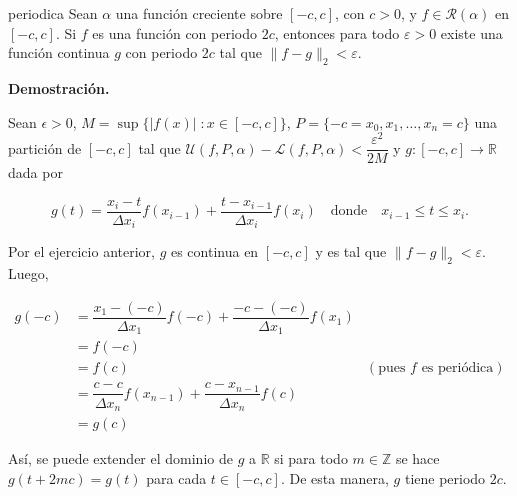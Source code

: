 \documentclass[fleqn]{article}
\newenvironment{corolario}[2]{\begin{cor}[breakable, pad at break = 5mm, leftrule = 0.7mm, rightrule = 0.7mm, right = 2mm, left = 2mm, enlarge bottom finally by = 3mm, fontupper = \setlength{\parskip}{2mm}, fontlower = \setlength{\parskip}{2mm}]{#1}{#2}}{\end{cor}}
\newcommand{\talque}{\; \mathbf{\colon}}
\newcommand{\rsi}[1]{\mathcal{R}(#1)}
\newcommand{\ent}{\mathbb{Z}}
\newcommand{\real}{\mathbb{R}}
\begin{document}
	\begin{corolario}{}{periodica}
		Sean $ \alpha $ una función creciente sobre $ [-c,c] $, con $ c > 0 $, y $ f \in \rsi{\alpha} $ en $ [-c,c] $.
		Si $f$ es una función con periodo $ 2c $, entonces para todo $ \varepsilon > 0 $ existe una función continua $ g $ con periodo $ 2c $ tal que $ \lVert f - g \rVert_2 < \varepsilon $.

		\tcblower

		\textbf{Demostración.}

		Sean $ \epsilon > 0 $, $ M = \sup \bigl\lbrace \lvert f(x) \rvert \talque x \in [-c,c] \bigr\rbrace $, $ P = \lbrace -c = x_0, x_1, \ldots, x_n = c \rbrace $ una partición de $ [-c,c] $ tal que $ \mathcal{U} (f,P,\alpha) - \mathcal{L} (f,P,\alpha) < \dfrac{\varepsilon^2}{2M} $ y $ g \colon [-c,c] \to \real $ dada por
		
		\begin{equation*}
			g(t) = \dfrac{x_i - t}{\Delta x_i} f(x_{i-1}) + \dfrac{t - x_{i-1}}{\Delta x_i} f(x_i) \quad \mbox{donde} \quad x_{i-1} \leq t \leq x_i.
		\end{equation*}
		
		Por el ejercicio anterior, $ g $ es continua en $ [-c,c] $ y es tal que $ \lVert f - g \rVert_2 < \varepsilon $. Luego, 
		
		\begin{align*}
			g(-c) &= \dfrac{x_1 - (-c)}{\Delta x_1} f(-c) + \dfrac{-c - (-c)}{\Delta x_1} f(x_1) & \\
			&= f(-c) & \\
			&= f(c) & (\mbox{pues } f \mbox{ es periódica}) \\
			&= \dfrac{c - c}{\Delta x_n} f(x_{n-1}) + \dfrac{c - x_{n-1}}{\Delta x_n} f(c) & \\
			&= g(c) &
		\end{align*}

		Así, se puede extender el dominio de $g$ a $ \real $ si para todo $ m \in \ent $ se hace $ g(t+2mc) = g(t) $ para cada $ t \in [-c,c] $. De esta manera, $g$ tiene periodo $ 2c $.
	\end{corolario}
\end{document}
